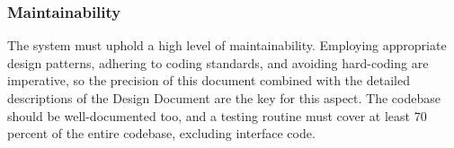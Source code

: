 \subsubsection{Maintainability}
The \app system must uphold a high level of maintainability. Employing appropriate design patterns, adhering to coding standards, and avoiding hard-coding are imperative, so the precision of this document combined with the detailed descriptions of the Design Document are the key for this aspect. The codebase should be well-documented too, and a testing routine must cover at least 70 percent of the entire codebase, excluding interface code.

